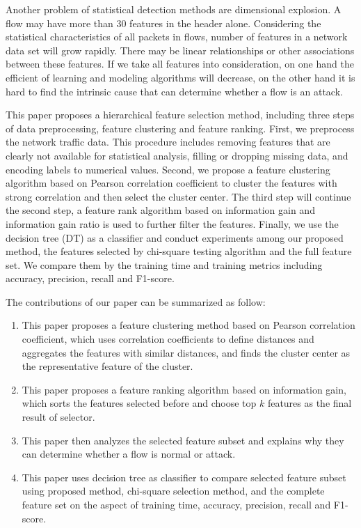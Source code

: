 \documentclass{ieeeaccess}
\theoremstyle{definition}
\begin{document}
Another problem of statistical detection methods are dimensional explosion. A flow may have more than 30 features in the header alone. Considering the statistical characteristics of all packets in flows, number of features in a network data set will grow rapidly. There may be linear relationships or other associations between these features. If we take all features into consideration, on one hand the efficient of learning and modeling algorithms will decrease, on the other hand it is hard to find the intrinsic cause that can determine whether a flow is an attack.

This paper proposes a hierarchical feature selection method, including three steps of data preprocessing, feature clustering and feature ranking. First, we preprocess the network traffic data. This procedure includes removing features that are clearly not available for statistical analysis, filling or dropping missing data, and encoding labels to numerical values. Second, we propose a feature clustering algorithm based on Pearson correlation coefficient to cluster the features with strong correlation and then select the cluster center. The third step will continue the second step, a feature rank algorithm based on information gain and information gain ratio is used to further filter the features. Finally, we use the decision tree (DT) as a classifier and conduct experiments among our proposed method, the features selected by chi-square testing algorithm and the full feature set. We compare them by the training time and training metrics including accuracy, precision, recall and F1-score. 

The contributions of our paper can be summarized as follow:

\begin{enumerate}
    \item This paper proposes a feature clustering method based on Pearson correlation coefficient, which uses correlation coefficients to define distances and aggregates the features with similar distances, and finds the cluster center as the representative feature of the cluster.
    \item This paper proposes a feature ranking algorithm based on information gain, which sorts the features selected before and choose top $k$ features as the final result of selector.
    \item This paper then analyzes the selected feature subset and explains why they can determine whether a flow is normal or attack.
    \item This paper uses decision tree as classifier to compare selected feature subset using proposed method, chi-square selection method, and the complete feature set on the aspect of training time, accuracy, precision, recall and F1-score.
\end{enumerate}
\end{document}
